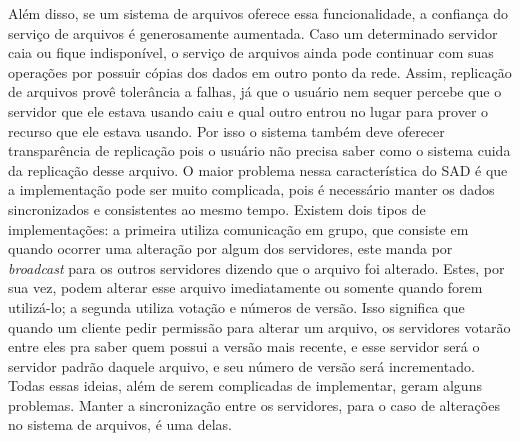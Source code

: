	
	Além disso, se um sistema de arquivos oferece essa funcionalidade, a confiança do serviço de arquivos é generosamente aumentada.
	Caso um determinado servidor caia ou fique indisponível, o serviço de arquivos ainda pode continuar com suas operações por possuir cópias dos dados em outro ponto da rede.
	Assim, replicação de arquivos provê tolerância a falhas, já que o usuário nem sequer percebe que o servidor que ele estava usando caiu e qual outro entrou no lugar para prover o recurso que ele estava usando. Por isso o sistema também deve oferecer transparência de replicação pois o usuário não precisa saber como o sistema cuida da replicação desse arquivo.
	O maior problema nessa característica do SAD é que a implementação pode ser muito complicada, pois é necessário manter os dados sincronizados e consistentes ao mesmo tempo.
	Existem dois tipos de implementações: a primeira utiliza comunicação em grupo, que consiste em quando ocorrer uma alteração por algum dos servidores, este manda por \textit{broadcast} para os outros servidores dizendo que o arquivo foi alterado. Estes, por
	sua vez, podem alterar esse arquivo imediatamente ou somente quando forem utilizá-lo; a segunda utiliza votação e números de versão. Isso significa que quando um cliente pedir permissão para alterar um arquivo, os servidores votarão entre eles pra saber quem possui a versão mais recente, e esse servidor será o servidor padrão daquele arquivo, e seu número de versão será incrementado. Todas essas ideias, além de serem complicadas de implementar, geram alguns problemas. Manter a sincronização entre os servidores, para o caso de alterações no sistema de arquivos, é uma delas.
	

